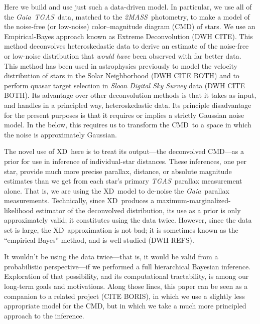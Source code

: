 \documentclass[modern]{aastex61}
\newcommand{\acronym}[1]{{\small{#1}}}
\newcommand{\project}[1]{\textsl{#1}}
\newcommand{\tgas}{\project{\acronym{TGAS}}}
\newcommand{\tmass}{\project{\acronym{2MASS}}}
\newcommand{\gaia}{\project{Gaia}}
\newcommand{\xd}{\acronym{XD}}
\newcommand{\cmd}{\acronym{CMD}}
\begin{document}
Here we build and use just such a data-driven model.
In particular, we use all of the \gaia\ \tgas\ data, matched to the \tmass\
photometry, to make a model of the noise-free (or low-noise)
color--magnitude diagram (\cmd) of stars.
We use
an Empirical-Bayes approach known as Extreme Deconvolution (DWH CITE).
This method deconvolves heteroskedastic data to derive an estimate
of the noise-free or low-noise distribution that \emph{would have}
been observed with far better data.
This method has been used in astrophysics
previously to model the velocity distribution of stars in the Solar
Neighborhood (DWH CITE BOTH) and to perform quasar target selection
in \project{Sloan Digital Sky Survey} data (DWH CITE BOTH).
Its advantage over other deconvolution methods is that it takes as input,
and handles in a principled way, heteroskedastic data.
Its principle disadvantage for the present purposes is that it requires
or implies a strictly Gaussian noise model.
In the below, this requires us to transform the \cmd\ to a space in which
the noise is approximately Gaussian.

The novel use of \xd\ here is to treat its output---the deconvolved \cmd---as
a prior for use in inference of individual-star distances.
These inferences, one per star, provide much more precise parallax, distance,
or absolute magnitude estimates than we get from each star's primary
\tgas\ parallax measurement alone.
That is, we are using the \xd\ model to de-noise the \gaia\ parallax
measurements.
Technically, since \xd\ produces a maximum-marginalized-likelihood estimator
of the deconvolved distribution,
its use as a prior is only approximately valid; it constitutes using the
data twice.
However, since the data set is large, the \xd\ approximation is not bad; it is
sometimes known as the ``empirical Bayes'' method, and is well studied (DWH REFS).

It wouldn't be using the data twice---that is, it would be valid from a
probabilistic perspective---if we performed a full hierarchical Bayesian
inference.
Exploration of that possibility, and its computational tractability,
is among our long-term goals and motivations.
Along those lines, this paper can be seen as a companion to
a related project (CITE BORIS), in which we use a
slightly less appropriate model for the \cmd, but in which we take a much more principled
approach to the inference.
\end{document}
